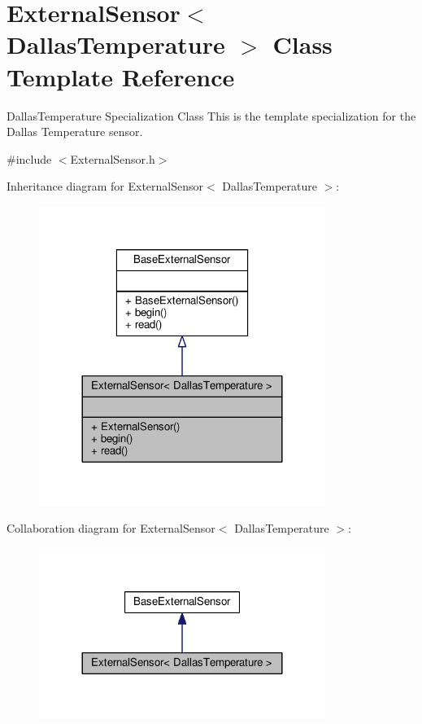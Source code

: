 \hypertarget{class_external_sensor_3_01_dallas_temperature_01_4}{}\section{External\+Sensor$<$ Dallas\+Temperature $>$ Class Template Reference}
\label{class_external_sensor_3_01_dallas_temperature_01_4}


Dallas\+Temperature Specialization Class This is the template specialization for the Dallas Temperature sensor.  




{\ttfamily \#include $<$External\+Sensor.\+h$>$}



Inheritance diagram for External\+Sensor$<$ Dallas\+Temperature $>$\+:\nopagebreak
\begin{figure}[H]
\begin{center}
\leavevmode
\includegraphics[width=264pt]{class_external_sensor_3_01_dallas_temperature_01_4__inherit__graph}
\end{center}
\end{figure}


Collaboration diagram for External\+Sensor$<$ Dallas\+Temperature $>$\+:\nopagebreak
\begin{figure}[H]
\begin{center}
\leavevmode
\includegraphics[width=264pt]{class_external_sensor_3_01_dallas_temperature_01_4__coll__graph}
\end{center}
\end{figure}
